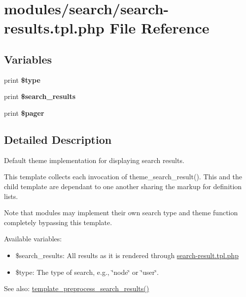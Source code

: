 \hypertarget{search-results_8tpl_8php}{
\section{modules/search/search-results.tpl.php File Reference}
\label{search-results_8tpl_8php}
}
\subsection*{Variables}
\begin{CompactItemize}
\item 
\hypertarget{search-results_8tpl_8php_c4d4c56358032c00065202143a3b7a85}{
print \textbf{\$type}}
\label{search-results_8tpl_8php_c4d4c56358032c00065202143a3b7a85}

\item 
\hypertarget{search-results_8tpl_8php_585801d7887a0537438a9dcedf0735d1}{
print \textbf{\$search\_\-results}}
\label{search-results_8tpl_8php_585801d7887a0537438a9dcedf0735d1}

\item 
\hypertarget{search-results_8tpl_8php_832d48720a0d8c51e6a14792173c3a61}{
print \textbf{\$pager}}
\label{search-results_8tpl_8php_832d48720a0d8c51e6a14792173c3a61}

\end{CompactItemize}


\subsection{Detailed Description}
Default theme implementation for displaying search results.

This template collects each invocation of theme\_\-search\_\-result(). This and the child template are dependant to one another sharing the markup for definition lists.

Note that modules may implement their own search type and theme function completely bypassing this template.

Available variables:\begin{itemize}
\item \$search\_\-results: All results as it is rendered through \hyperlink{search-result_8tpl_8php}{search-result.tpl.php}\item \$type: The type of search, e.g., \char`\"{}node\char`\"{} or \char`\"{}user\char`\"{}.\end{itemize}


\begin{Desc}
\item[See also:]\hyperlink{search_8pages_8inc_a0012b762375491296b1248124a177e9}{template\_\-preprocess\_\-search\_\-results()} \end{Desc}
